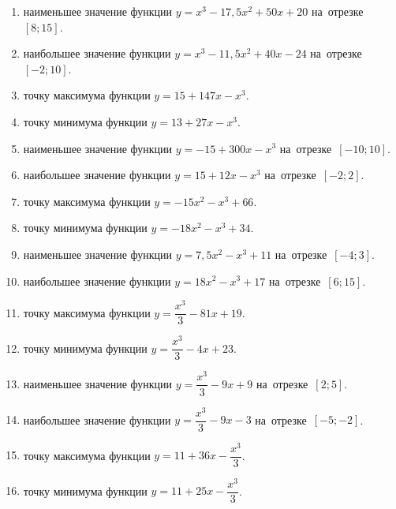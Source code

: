 \documentclass[a4paper,10pt]{article}
\begin{document}
\begin{enumerate}
\item {} наименьшее значение функции $y=x^3 -17,5x^2+50x+20$ на~отрезке~$\left[8;15\right]$.

\item {} наибольшее значение функции $y=x^3 -11,5x^2+40x-24$ на~отрезке~$\left[-2;10\right]$.

\item {} точку максимума функции $y=15+147x-x^3$.

\item {} точку минимума функции $y=13+27x-x^3$.

\item {} наименьшее значение функции $y=-15+300x-x^3$ на~отрезке~$\left[-10;10\right]$.

\item {} наибольшее значение функции $y=15+12x-x^3$ на~отрезке~$\left[-2;2\right]$.

\item {} точку максимума функции $y=-15x^2-x^3+66$.

\item {} точку минимума функции $y=-18x^2-x^3+34$.

\item {} наименьшее значение функции $y=7,5x^2-x^3+11$ на~отрезке~$\left[-4;3\right]$.

\item {} наибольшее значение функции $y=18x^2-x^3+17$ на~отрезке~$\left[6;15\right]$.

\item {} точку максимума функции $y=\dfrac{x^3}{3} -81x+19$.

\item {} точку минимума функции $y=\dfrac{x^3}{3} -4x+23$.

\item {} наименьшее значение функции $y=\dfrac{x^3}{3} -9x+9$ на~отрезке~$\left[2;5\right]$.

\item {} наибольшее значение функции $y=\dfrac{x^3}{3} -9x-3$ на~отрезке~$\left[-5;-2\right]$.

\item {} точку максимума функции $y=11 +36x-\dfrac{x^3}{3}$.

\item {} точку минимума функции $y=11 +25x-\dfrac{x^3}{3}$.


\end{enumerate}
\end{document}
